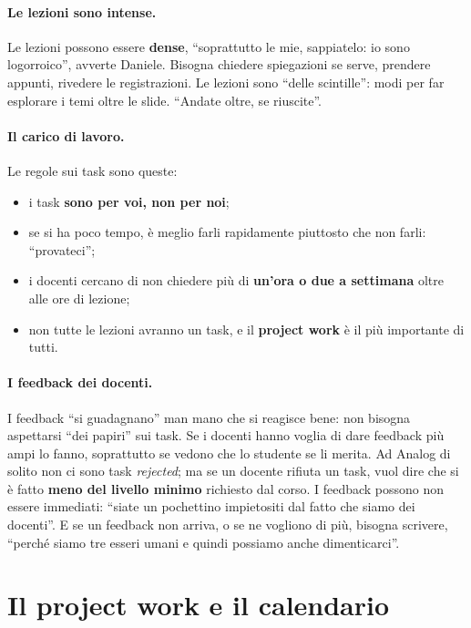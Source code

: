 \paragraph{Le lezioni sono intense.} Le lezioni possono essere \textbf{dense},
``soprattutto le mie, sappiatelo: io sono logorroico'', avverte Daniele. Bisogna
chiedere spiegazioni se serve, prendere appunti, rivedere le registrazioni. Le
lezioni sono ``delle scintille'': modi per far esplorare i temi oltre le slide.
``Andate oltre, se riuscite''.

\paragraph{Il carico di lavoro.} Le regole sui task sono queste:
\begin{itemize}
  \item i task \textbf{sono per voi, non per noi};
  \item se si ha poco tempo, è meglio farli rapidamente piuttosto che non farli:
        ``provateci'';
  \item i docenti cercano di non chiedere più di \textbf{un'ora o due a
        settimana} oltre alle ore di lezione;
  \item non tutte le lezioni avranno un task, e il \textbf{project work} è il più
        importante di tutti.
\end{itemize}

\paragraph{I feedback dei docenti.} I feedback ``si guadagnano'' man mano che si
reagisce bene: non bisogna aspettarsi ``dei papiri'' sui task. Se i docenti
hanno voglia di dare feedback più ampi lo fanno, soprattutto se vedono che lo
studente se li merita. Ad Analog di solito non ci sono task \emph{rejected}; ma
se un docente rifiuta un task, vuol dire che si è fatto \textbf{meno del livello
minimo} richiesto dal corso. I feedback possono non essere immediati: ``siate un
pochettino impietositi dal fatto che siamo dei docenti''. E se un feedback non
arriva, o se ne vogliono di più, bisogna scrivere, ``perché siamo tre esseri
umani e quindi possiamo anche dimenticarci''.

\section{Il project work e il calendario}
\label{a1:sec:project}

